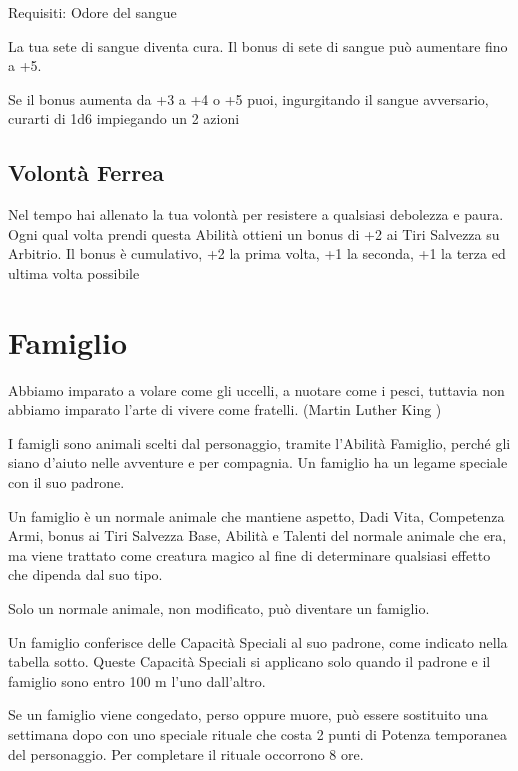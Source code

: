 \documentclass[a4paper,11pt,twoside,openany]{book}
\begin{document}
Requisiti: Odore del sangue

La tua sete di sangue diventa cura. Il bonus di sete di sangue può aumentare fino a +5.

Se il bonus aumenta da +3 a +4 o +5 puoi, ingurgitando il sangue avversario, curarti di 1d6 impiegando un 2 azioni

\subsection{Volontà Ferrea}

Nel tempo hai allenato la tua volontà per resistere a qualsiasi debolezza e paura. Ogni qual volta prendi questa Abilità ottieni un bonus di +2 ai Tiri Salvezza su Arbitrio. Il bonus è cumulativo, +2 la prima volta, +1 la seconda, +1 la terza ed ultima volta possibile

\pagebreak

\section{Famiglio}

\label{famiglio}
\begin{tcolorbox}[enhanced,arc=5pt,boxrule=0.3pt]{
		Abbiamo imparato a volare come gli uccelli, a nuotare come i pesci, tuttavia non abbiamo imparato l'arte di vivere come fratelli. (Martin Luther King )}\end{tcolorbox}\medskip

I famigli sono animali scelti dal personaggio, tramite l'Abilità Famiglio, perché gli siano d'aiuto nelle avventure e per compagnia. Un famiglio ha un legame speciale con il suo padrone.

Un famiglio è un normale animale che mantiene aspetto, Dadi Vita, Competenza Armi, bonus ai Tiri Salvezza Base, Abilità e Talenti del normale animale che era, ma viene trattato come creatura magico al fine di determinare qualsiasi effetto che dipenda dal suo tipo.

Solo un normale animale, non modificato, può diventare un famiglio.

Un famiglio conferisce delle Capacità Speciali al suo padrone, come indicato nella tabella sotto. Queste Capacità Speciali si applicano solo quando il padrone e il famiglio sono entro 100 m l'uno dall'altro.

Se un famiglio viene congedato, perso oppure muore, può essere sostituito una settimana dopo con uno speciale rituale che costa 2 punti di Potenza temporanea del personaggio. Per completare il rituale occorrono 8 ore.
\end{document}
